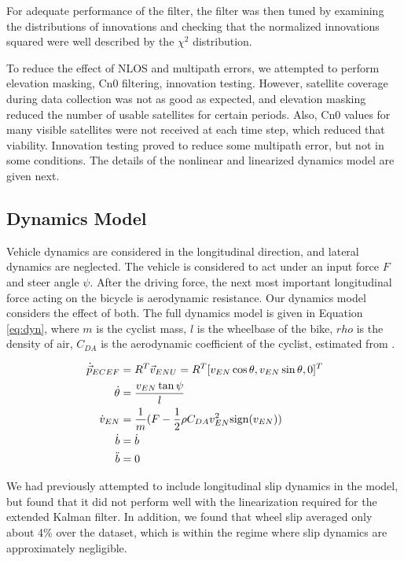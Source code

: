 \documentclass[letterpaper,times]{IONconf}
\begin{document}
For adequate performance of the filter, the filter was then tuned by examining the distributions of innovations and checking that the normalized innovations squared were well described by the $\chi^2$ distribution.

To reduce the effect of NLOS and multipath errors, we attempted to perform elevation masking, Cn0 filtering, innovation testing. However, satellite coverage during data collection was not as good as expected, and elevation masking reduced the number of usable satellites for certain periods. Also, Cn0 values for many visible satellites were not received at each time step, which reduced that viability. Innovation testing proved to reduce some multipath error, but not in some conditions. The details of the nonlinear and linearized dynamics model are given next.

\subsection{Dynamics Model}

Vehicle dynamics are considered in the longitudinal direction, and lateral dynamics are neglected. The vehicle is considered to act under an input force $F $ and steer angle $\psi $. After the driving force, the next most important longitudinal force acting on the bicycle is aerodynamic resistance. Our dynamics model considers the effect of both. The full dynamics model is given in Equation \eqref{eq:dyn}, where $m$ is the cyclist mass, $l$ is the wheelbase of the bike, $rho$ is the density of air, $C_{DA}$ is the aerodynamic coefficient of the cyclist, estimated from \cite{Crouch17}. 

\begin{equation}
    \begin{aligned}
        \dot{\vec{p}}_{ECEF} &= R^T \vec{v}_{ENU} = R^T [v_{EN} \cos \theta , v_{EN} \sin \theta,0]^T\\
        \dot{\theta} &= \frac{ v_{EN} \tan \psi }{l}\\
        \dot{v}_{EN} &= \frac{ 1}{m }( F - \frac{ 1}{2 }\rho C_{DA} v_{EN}^2\mathrm{sign}(v_{EN}))\\
        \dot{b} &= \dot{b}\\
        \ddot{b} &= 0
    \end{aligned} \label{eq:dyn}
\end{equation}

We had previously attempted to include longitudinal slip dynamics in the model, but found that it did not perform well with the linearization required for the extended Kalman filter. In addition, we found that wheel slip averaged only about 4\% over the dataset, which is within the regime where slip dynamics are approximately negligible. 
\end{document}
